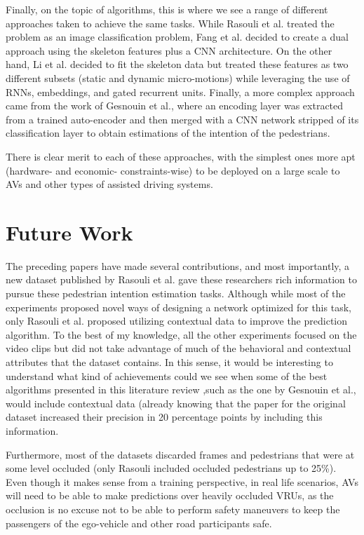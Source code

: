 \documentclass[conference, onecolumn]{IEEEtran}
\begin{document}
Finally, on the topic of algorithms, this is where we see a range of different approaches taken to achieve the same tasks. While Rasouli et al. treated the problem as an image classification problem, Fang et al. decided to create a dual approach using the skeleton features plus a CNN architecture. On the other hand, Li et al. decided to fit the skeleton data but treated these features as two different subsets (static and dynamic micro-motions) while leveraging the use of RNNs, embeddings, and gated recurrent units. Finally, a more complex approach came from the work of Gesnouin et al., where an encoding layer was extracted from a trained auto-encoder and then merged with a CNN network stripped of its classification layer to obtain estimations of the intention of the pedestrians.

There is clear merit to each of these approaches, with the simplest ones more apt (hardware- and economic- constraints-wise) to be deployed on a large scale to AVs and other types of assisted driving systems.

\section{Future Work}\label{sec:future-work}
The preceding papers have made several contributions, and most importantly, a new dataset published by Rasouli et al. gave these researchers rich information to pursue these pedestrian intention estimation tasks. Although while most of the experiments proposed novel ways of designing a network optimized for this task, only Rasouli et al. proposed utilizing contextual data to improve the prediction algorithm. To the best of my knowledge, all the other experiments focused on the video clips but did not take advantage of much of the behavioral and contextual attributes that the dataset contains. In this sense, it would be interesting to understand what kind of achievements could we see when some of the best algorithms presented in this literature review ,such as the one by Gesnouin et al., would include contextual data (already knowing that the paper for the original dataset increased their precision in 20 percentage points by including this information.

Furthermore, most of the datasets discarded frames and pedestrians that were at some level occluded (only Rasouli included occluded pedestrians up to 25\%). Even though it makes sense from a training perspective, in real life scenarios, AVs will need to be able to make predictions over heavily occluded VRUs, as the occlusion is no excuse not to be able to perform safety maneuvers to keep the passengers of the ego-vehicle and other road participants safe.
\end{document}
